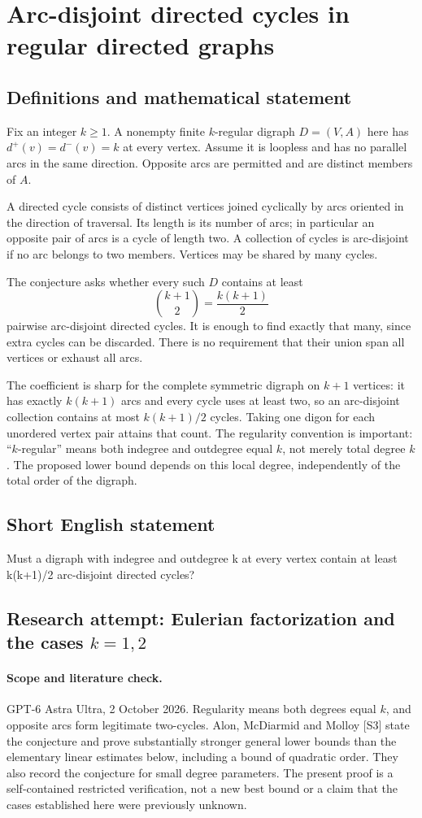 \documentclass[11pt,a4paper]{article}
\begin{document}
\section*{Arc-disjoint directed cycles in regular directed graphs}\label{statement}

\subsection{Definitions and mathematical statement}
Fix an integer $k\ge1$. A nonempty finite $k$-regular digraph $D=(V,A)$ here has
$d^+(v)=d^-(v)=k$ at every vertex. Assume it is loopless and has no
parallel arcs in the same direction. Opposite arcs are permitted and
are distinct members of $A$.

A directed cycle consists of distinct vertices joined cyclically by
arcs oriented in the direction of traversal. Its length is its number
of arcs; in particular an opposite pair of arcs is a cycle of length
two. A collection of cycles is arc-disjoint if no arc belongs to two
members. Vertices may be shared by many cycles.

The conjecture asks whether every such $D$ contains at least
\[
                             \binom{k+1}{2}=\frac{k(k+1)}2
\]
pairwise arc-disjoint directed cycles. It is enough to find exactly
that many, since extra cycles can be discarded. There is no requirement
that their union span all vertices or exhaust all arcs.

The coefficient is sharp for the complete symmetric digraph on $k+1$
vertices: it has exactly $k(k+1)$ arcs and every cycle uses at least two,
so an arc-disjoint collection contains at most $k(k+1)/2$ cycles. Taking
one digon for each unordered vertex pair attains that count. The
regularity convention is important: ``$k$-regular'' means both indegree
and outdegree equal $k$, not merely total degree $k$. The proposed lower
bound depends on this local degree, independently of the total order
of the digraph.
\subsection{Short English statement}
Must a digraph with indegree and outdegree k at every vertex contain at least k(k+1)/2 arc-disjoint directed cycles?
\subsection{Research attempt: Eulerian factorization and the cases $k=1,2$}
\paragraph{Scope and literature check.}
GPT-6 Astra Ultra, 2 October 2026. Regularity means both degrees equal
$k$, and opposite arcs form legitimate two-cycles. Alon,
McDiarmid and Molloy [S3] state the conjecture and prove substantially
stronger general lower bounds than the elementary linear estimates
below, including a bound of quadratic order. They also record the
conjecture for small degree parameters. The present proof is a
self-contained restricted verification, not a new best bound or a
claim that the cases established here were previously unknown.
\end{document}
